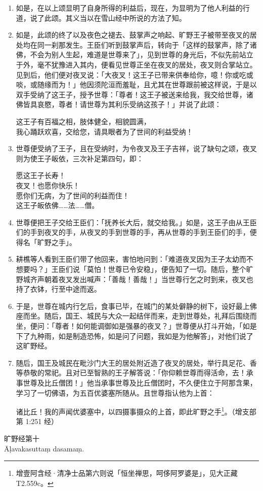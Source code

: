 \begin{enumerate}\item 如是，在以上颂显明了自身所得的利益后，现在，为显明为了他人利益的行道，说了此颂。其义当以在雪山经中所说的方法了知。
\item 如是，此颂的终了以及夜色之褪去、鼓掌声之响起、旷野王子被带至夜叉的居处均在同一刹那发生。王臣们听到鼓掌声后，转向于「这样的鼓掌声，除了诸佛，不会为别人生起，难道是世尊来了」，见到世尊的身光后，不似先前站立于外，毫不犹豫进入其内，便看见世尊正坐在夜叉的居处，夜叉则合掌站立。见到后，他们便对夜叉说：「大夜叉！这王子已带来供奉给你，噫！你或吃或啖，或随缘而为！」他因须陀洹而羞耻，且尤其在世尊跟前被这样说，于是以双手受纳了这王子，授予世尊：「尊者！这王子被送来给我，我交给世尊，诸佛皆具哀愍，尊者！请世尊为其利乐受纳这孩子！」并说了此颂：\begin{quoting}这王子有百福之相，肢体健全，相貌圆满，\\我心踊跃欢喜，交给您，请具眼者为了世间的利益受纳！\end{quoting}
\item 世尊便受纳了王子，且在受纳时，为令夜叉及王子吉祥，说了缺句之颂，夜叉则为使王子皈依，三次补足第四句，即：\begin{quoting}愿这王子长寿！\\夜叉！也愿你快乐！\\愿你们无病，为了世间的利益而住！\\这王子皈依佛……法……僧。\end{quoting}
\item 世尊便把王子交给王臣们：「抚养长大后，就交给我。」如是，这王子由从王臣们的手到夜叉的手，从夜叉的手到世尊的手，再从世尊的手到王臣们的手，便得名「旷野之手」。
\item 耕樵等人看到王臣们带了他回来，害怕地问到：「难道夜叉因为王子太幼而不想要吗？」王臣们说「莫怕！世尊已令安稳」，便告知了一切。随后，整个旷野城齐声朝着夜叉发出喊声：「善哉！善哉！」当世尊行乞之时到来，夜叉也持了衣钵，行至中途而返。
\item 于是，世尊在城内行乞后，食事已毕，在城门的某处僻静的树下，设好最上佛座而坐。随后，国王、城民与大众一起结伴而来，走到世尊处，礼拜后围绕而坐，便问：「尊者！如何能调御如是强暴的夜叉？」世尊便从打斗开始，「如是下了九种雨，如是制造恐怖，如是问了问题，我如是为他解答」，对他们说了这旷野经。
\item 随后，国王及城民在毗沙门大王的居处附近造了夜叉的居处，举行具足花、香等恭敬的常祀。且对已至智熟的王子解答说：「你仰赖世尊而得活命，去！承事世尊及比丘僧团！」他当承事世尊及比丘僧团时，不久便住立于阿那含果，学习了一切佛语，为五百优婆塞所随从。且世尊指认他为上首：\begin{quoting}诸比丘！我的声闻优婆塞中，以四摄事摄众的上首，即此旷野之手\footnote{增壹阿含经·清净士品第六则说「恒坐禅思，呵侈阿罗婆是」，见大正藏 T2.559c。}。（增支部第 1:251 经）\end{quoting}\end{enumerate}

\begin{center}\vspace{1em}旷野经第十\\Āḷavakasuttaṃ dasamaṃ.\end{center}

